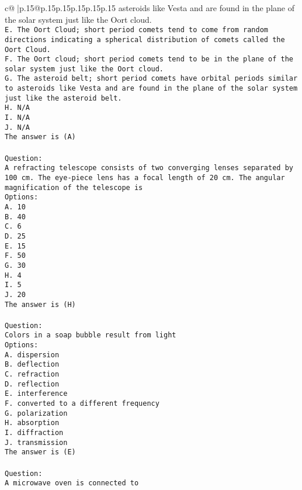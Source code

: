 \documentclass{article}
\begin{document}
{\begin{supertabular}{c@{$\;$}|p{.15\linewidth}@{}p{.15\linewidth}p{.15\linewidth}p{.15\linewidth}p{.15\linewidth}p{.15\linewidth}}
{{{asteroids like Vesta and are found in the plane of the solar system just like the Oort cloud.\\ \tt E. The Oort Cloud; short period comets tend to come from random directions indicating a spherical distribution of comets called the Oort Cloud.\\ \tt F. The Oort cloud; short period comets tend to be in the plane of the solar system just like the Oort cloud.\\ \tt G. The asteroid belt; short period comets have orbital periods similar to asteroids like Vesta and are found in the plane of the solar system just like the asteroid belt.\\ \tt H. N/A\\ \tt I. N/A\\ \tt J. N/A\\ \tt The answer is (A)\\ \tt \\ \tt Question:\\ \tt A refracting telescope consists of two converging lenses separated by 100 cm. The eye-piece lens has a focal length of 20 cm. The angular magnification of the telescope is\\ \tt Options:\\ \tt A. 10\\ \tt B. 40\\ \tt C. 6\\ \tt D. 25\\ \tt E. 15\\ \tt F. 50\\ \tt G. 30\\ \tt H. 4\\ \tt I. 5\\ \tt J. 20\\ \tt The answer is (H)\\ \tt \\ \tt Question:\\ \tt Colors in a soap bubble result from light\\ \tt Options:\\ \tt A. dispersion\\ \tt B. deflection\\ \tt C. refraction\\ \tt D. reflection\\ \tt E. interference\\ \tt F. converted to a different frequency\\ \tt G. polarization\\ \tt H. absorption\\ \tt I. diffraction\\ \tt J. transmission\\ \tt The answer is (E)\\ \tt \\ \tt Question:\\ \tt A microwave oven is connected to }}}
\end{supertabular}}
\end{document}
